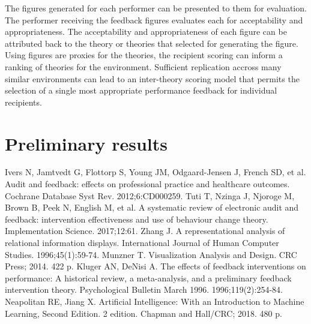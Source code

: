 \documentclass{amia}
\begin{document}
The figures generated for each performer can be presented to them for evaluation.
The performer receiving the feedback figures evaluates each for acceptability and appropriateness.
The acceptability and appropriateness of each figure can be attributed back to the theory or theories that selected for generating the figure.
Using figures are proxies for the theories, the recipient scoring can inform a ranking of theories for the environment.
Sufficient replication accross many similar environments can lead to an inter-theory scoring model that permits the selection of a single most appropriate performance feedback for individual recipients.



\section*{Preliminary results}





\makeatletter
\renewcommand{\@biblabel}[1]{\hfill #1.}
\makeatother


\begin{thebibliography}{1}
\setlength\itemsep{-0.1em}

Ivers N, Jamtvedt G, Flottorp S, Young JM, Odgaard-Jensen J, French SD, et al. Audit and feedback: effects on professional practice and healthcare outcomes. Cochrane Database Syst Rev. 2012;6:CD000259. 
Tuti T, Nzinga J, Njoroge M, Brown B, Peek N, English M, et al. A systematic review of electronic audit and feedback: intervention effectiveness and use of behaviour change theory. Implementation Science. 2017;12:61.
Zhang J. A representational analysis of relational information displays. International Journal of Human Computer Studies. 1996;45(1):59-74.
Munzner T. Visualization Analysis and Design. CRC Press; 2014. 422 p. 
Kluger AN, DeNisi A. The effects of feedback interventions on performance: A historical review, a meta-analysis, and a preliminary feedback intervention theory. Psychological Bulletin March 1996. 1996;119(2):254-84.
Neapolitan RE, Jiang X. Artificial Intelligence: With an Introduction to Machine Learning, Second Edition. 2 edition. Chapman and Hall/CRC; 2018. 480 p. 




\end{thebibliography}
\end{document}
